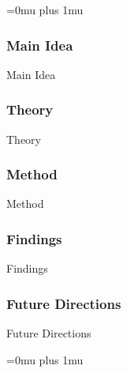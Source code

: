 \Urlmuskip=0mu plus 1mu\relax

\subsubsection{Main Idea}

\noindent
Main Idea

\subsubsection{Theory}

\noindent
Theory

\subsubsection{Method}

\noindent
Method

\subsubsection{Findings}

\noindent
Findings

\subsubsection{Future Directions}

\noindent
Future Directions 

\Urlmuskip=0mu plus 1mu\relax
\pagebreak
